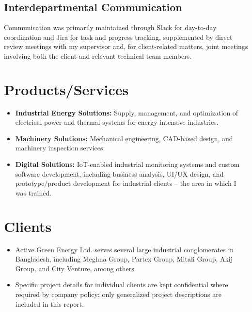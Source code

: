 \subsection{Interdepartmental Communication}
\par Communication was primarily maintained through Slack for day-to-day coordination and Jira for task and progress tracking, supplemented by direct review meetings with my supervisor and, for client-related matters, joint meetings involving both the client and relevant technical team members.

\section{Products/Services}
\begin{itemize}
    \item \textbf{Industrial Energy Solutions:} Supply, management, and optimization of electrical power and thermal systems for energy-intensive industries.
    \item \textbf{Machinery Solutions:} Mechanical engineering, CAD-based design, and machinery inspection services.
    \item \textbf{Digital Solutions:} IoT-enabled industrial monitoring systems and custom software development, including business analysis, UI/UX design, and prototype/product development for industrial clients -- the area in which I was trained.
\end{itemize}

\section{Clients}
\begin{itemize}
    \item Active Green Energy Ltd. serves several large industrial conglomerates in Bangladesh, including Meghna Group, Partex Group, Mitali Group, Akij Group, and City Venture, among others.
    \item Specific project details for individual clients are kept confidential where required by company policy; only generalized project descriptions are included in this report.
\end{itemize}


